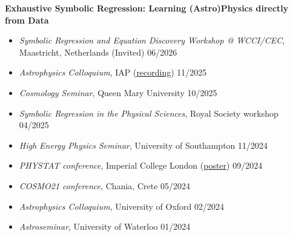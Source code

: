 \documentclass[11pt]{article}
\newenvironment{outerlist}[1][\enskip\textbullet]%
        {\begin{itemize}[#1]}{\end{itemize}%
         \vspace{-.6\baselineskip}}
\begin{document}
\vspace{-0.35\baselineskip}
\textbf{Exhaustive Symbolic Regression: Learning (Astro)Physics directly from Data}
\vspace{0.4\baselineskip}
\begin{outerlist}
\vspace{-0.8\baselineskip}
\item[] \textit{Symbolic Regression and Equation Discovery Workshop @ WCCI/CEC}, Maastricht, Netherlands (Invited) \hfill 06/2026 \\
\vspace{-1.4\baselineskip}
\item[] \textit{Astrophysics Colloquium}, IAP (\href{https://www.youtube.com/watch?v=HIpzCx9-4T0}{recording}) \hfill 11/2025 \\
\vspace{-1.4\baselineskip}
\item[] \textit{Cosmology Seminar}, Queen Mary University \hfill 10/2025 \\
\vspace{-1.4\baselineskip}
\item[] \textit{Symbolic Regression in the Physical Sciences}, Royal Society workshop \hfill 04/2025 \\
\vspace{-1.4\baselineskip}
\item[] \textit{High Energy Physics Seminar}, University of Southampton \hfill 11/2024 \\
\vspace{-1.4\baselineskip}
\item[] \textit{PHYSTAT conference}, Imperial College London (\href{https://indico.cern.ch/event/1407421/contributions/6097927/attachments/2924116/5132808/Imperial_Poster.pdf}{poster}) \hfill 09/2024 \\
\vspace{-1.4\baselineskip}
\item[] \textit{COSMO21 conference}, Chania, Crete \hfill 05/2024 \\
\vspace{-1.4\baselineskip}
\item[] \textit{Astrophysics Colloquium}, University of Oxford \hfill 02/2024 \\
\vspace{-1.4\baselineskip}
\item[] \textit{Astroseminar}, University of Waterloo \hfill 01/2024 \\
\vspace{-1.4\baselineskip}

\end{outerlist}
\end{document}
